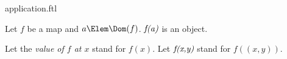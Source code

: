 \documentclass{stex}
\begin{document}
\begin{smodule}{application.ftl}



\begin{fakeforthel}
  \begin{signature}
    Let $f$ be a map and $a \Elem \Dom(f)$.
    $\emph{f(a)}$ is an object.
  \end{signature}
\end{fakeforthel}

\begin{forthel}
  \begin{convention}[for=value]
    Let the \emph{value of $f$ at $x$} stand for $f(x)$.
    Let $\emph{f(x,y)}$ stand for $f((x,y))$.
  \end{convention}
\end{forthel}

\end{smodule}
\end{document}
